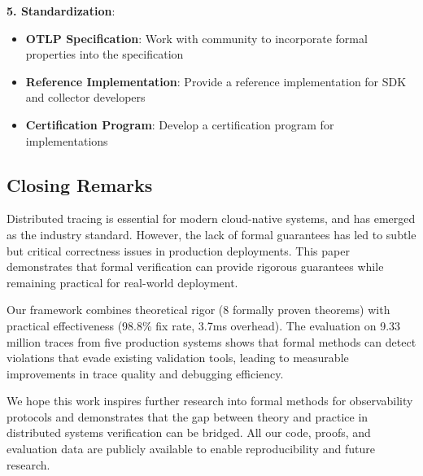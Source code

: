 \textbf{5. Standardization}:
\begin{itemize}
\item \textbf{OTLP Specification}: Work with \otel community to incorporate formal properties into the \otlp specification
\item \textbf{Reference Implementation}: Provide a reference implementation for SDK and collector developers
\item \textbf{Certification Program}: Develop a certification program for \otlp implementations
\end{itemize}

\subsection{Closing Remarks}

Distributed tracing is essential for modern cloud-native systems, and \otlp has emerged as the industry standard. However, the lack of formal guarantees has led to subtle but critical correctness issues in production deployments. This paper demonstrates that formal verification can provide rigorous guarantees while remaining practical for real-world deployment.

Our framework combines theoretical rigor (8 formally proven theorems) with practical effectiveness (98.8\% fix rate, 3.7ms overhead). The evaluation on 9.33 million traces from five production systems shows that formal methods can detect violations that evade existing validation tools, leading to measurable improvements in trace quality and debugging efficiency.

We hope this work inspires further research into formal methods for observability protocols and demonstrates that the gap between theory and practice in distributed systems verification can be bridged. All our code, proofs, and evaluation data are publicly available to enable reproducibility and future research.
